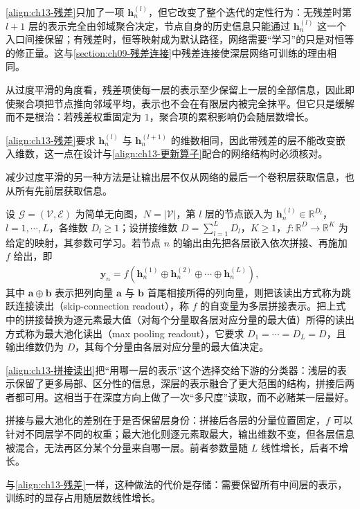 \documentclass[../../main.tex]{subfiles}
\begin{document}
\begin{remark}
\eqref{align:ch13-残差}只加了一项 $\bm{h}_n^{(l)}$，但它改变了整个迭代的定性行为：无残差时第 $l+1$ 层的表示完全由邻域聚合决定，节点自身的历史信息只能通过 $\bm{h}_n^{(l)}$ 这一个入口间接保留；有残差时，恒等映射成为默认路径，网络需要“学习”的只是对恒等的修正量。这与\cref{section:ch09-残差连接}中残差连接使深层网络可训练的理由相同。\par
从过度平滑的角度看，残差项使每一层的表示至少保留上一层的全部信息，因此即使聚合项把节点推向邻域平均，表示也不会在有限层内被完全抹平。但它只是缓解而不是根治：若残差权重固定为 $1$，聚合项的累积影响仍会随层数增长。\par
\eqref{align:ch13-残差}要求 $\bm{h}_n^{(l)}$ 与 $\bm{h}_n^{(l+1)}$ 的维数相同，因此带残差的层不能改变嵌入维数，这一点在设计与\eqref{align:ch13-更新算子}配合的网络结构时必须核对。
\end{remark}

减少过度平滑的另一种方法是让输出层不仅从网络的最后一个卷积层获取信息，也从所有先前层获取信息。

\begin{definition}[跳跃连接读出]\label{definition:ch13-跳跃连接读出}
设 $\mathcal{G}=(\mathcal{V},\mathcal{E})$ 为简单无向图，$N=|\mathcal{V}|$，第 $l$ 层的节点嵌入为 $\bm{h}_n^{(l)}\in\mathbb{R}^{D_l}$，$l=1,\cdots,L$，各维数 $D_l\geqslant1$；设拼接维数 $D=\sum_{l=1}^{L}D_l$，$K\geqslant1$，$f:\mathbb{R}^{D}\to\mathbb{R}^{K}$ 为给定的映射，其参数可学习。若节点 $n$ 的输出由先把各层嵌入依次拼接、再施加 $f$ 给出，即
\begin{align}
\bm{y}_n=f\!\left(\bm{h}_n^{(1)}\oplus\bm{h}_n^{(2)}\oplus\cdots\oplus\bm{h}_n^{(L)}\right),
\label{align:ch13-拼接读出}
\end{align}
其中 $\bm{a}\oplus\bm{b}$ 表示把列向量 $\bm{a}$ 与 $\bm{b}$ 首尾相接所得的列向量，则把该读出方式称为跳跃连接读出（skip-connection readout），称 $f$ 的自变量为多层拼接表示。把上式中的拼接替换为逐元素最大值（对每个分量取各层对应分量的最大值）所得的读出方式称为最大池化读出（max pooling readout），它要求 $D_1=\cdots=D_L=D$，且输出维数仍为 $D$，其每个分量由各层对应分量的最大值决定。
\end{definition}

\begin{remark}
\eqref{align:ch13-拼接读出}把“用哪一层的表示”这个选择交给下游的分类器：浅层的表示保留了更多局部、区分性的信息，深层的表示融合了更大范围的结构，拼接后两者都可用。这相当于在深度方向上做了一次“多尺度”读取，而不必赌某一层最好。\par
拼接与最大池化的差别在于是否保留层身份：拼接后各层的分量位置固定，$f$ 可以针对不同层学不同的权重；最大池化则逐元素取最大，输出维数不变，但各层信息被混合，无法再区分某个分量来自哪一层。前者参数量随 $L$ 线性增长，后者不增长。\par
与\eqref{align:ch13-残差}一样，这种做法的代价是存储：需要保留所有中间层的表示，训练时的显存占用随层数线性增长。
\end{remark}
\end{document}
